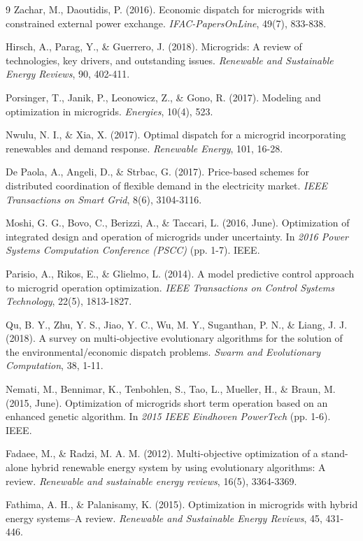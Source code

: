 \documentclass[final,3p,times]{elsarticle}
\begin{document}
\begin{thebibliography}{9}
Zachar, M., Daoutidis, P. (2016). Economic dispatch for microgrids with constrained external power exchange. \textit{IFAC-PapersOnLine}, 49(7), 833-838.

Hirsch, A., Parag, Y., \& Guerrero, J. (2018). Microgrids: A review of technologies, key drivers, and outstanding issues. \textit{Renewable and Sustainable Energy Reviews}, 90, 402-411.

Porsinger, T., Janik, P., Leonowicz, Z., \& Gono, R. (2017). Modeling and optimization in microgrids. \textit{Energies}, 10(4), 523.

Nwulu, N. I., \& Xia, X. (2017). Optimal dispatch for a microgrid incorporating renewables and demand response. \textit{Renewable Energy}, 101, 16-28.

De Paola, A., Angeli, D., \& Strbac, G. (2017). Price-based schemes for distributed coordination of flexible demand in the electricity market. \textit{IEEE Transactions on Smart Grid}, 8(6), 3104-3116.

Moshi, G. G., Bovo, C., Berizzi, A., \& Taccari, L. (2016, June). Optimization of integrated design and operation of microgrids under uncertainty. In \textit{2016 Power Systems Computation Conference (PSCC)} (pp. 1-7). IEEE.

Parisio, A., Rikos, E., \& Glielmo, L. (2014). A model predictive control approach to microgrid operation optimization. \textit{IEEE Transactions on Control Systems Technology}, 22(5), 1813-1827.

Qu, B. Y., Zhu, Y. S., Jiao, Y. C., Wu, M. Y., Suganthan, P. N., \& Liang, J. J. (2018). A survey on multi-objective evolutionary algorithms for the solution of the environmental/economic dispatch problems. \textit{Swarm and Evolutionary Computation}, 38, 1-11.

Nemati, M., Bennimar, K., Tenbohlen, S., Tao, L., Mueller, H., \& Braun, M. (2015, June). Optimization of microgrids short term operation based on an enhanced genetic algorithm. In \textit{2015 IEEE Eindhoven PowerTech} (pp. 1-6). IEEE.

Fadaee, M., \& Radzi, M. A. M. (2012). Multi-objective optimization of a stand-alone hybrid renewable energy system by using evolutionary algorithms: A review. \textit{Renewable and sustainable energy reviews}, 16(5), 3364-3369.

Fathima, A. H., \& Palanisamy, K. (2015). Optimization in microgrids with hybrid energy systems–A review. \textit{Renewable and Sustainable Energy Reviews}, 45, 431-446.


\end{thebibliography}
\end{document}
